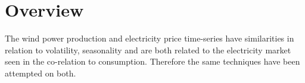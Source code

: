 \section{Overview}
The wind power production and electricity price time-series have similarities in relation to volatility, seasonality and are both related to the electricity market seen in the co-relation to consumption. Therefore the same techniques have been attempted on both.